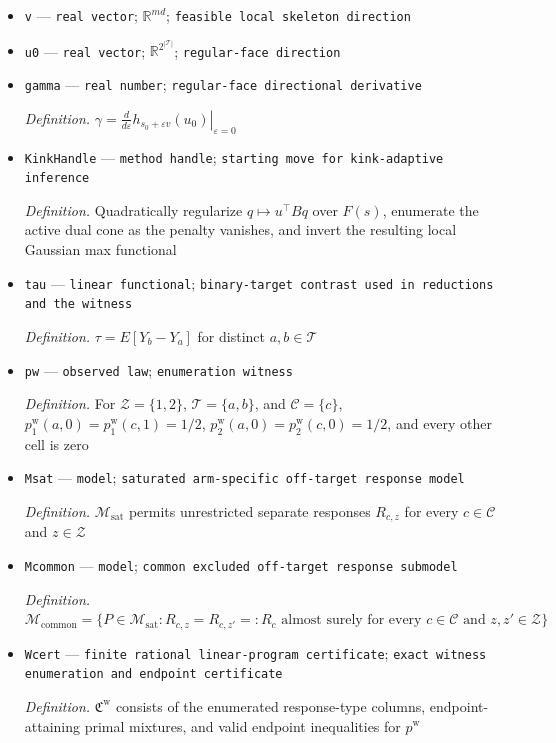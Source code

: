 \documentclass{article}
\begin{document}
\begin{itemize}
  \item \texttt{v} --- \texttt{real vector}; \(\mathbb R^{md}\); \texttt{feasible local skeleton direction}
  \item \texttt{u0} --- \texttt{real vector}; \(\mathbb R^{2^{|\mathcal T|}}\); \texttt{regular-\allowbreak{}face direction}
  \item \texttt{gamma} --- \texttt{real number}; \texttt{regular-\allowbreak{}face directional derivative}
  \par\smallskip\noindent\emph{Definition.} \(\gamma=\left.\frac{d}{d\varepsilon}h_{s_0+\varepsilon v}(u_0)\right|_{\varepsilon=0}\)
  \item \texttt{KinkHandle} --- \texttt{method handle}; \texttt{starting move for kink-\allowbreak{}adaptive inference}
  \par\smallskip\noindent\emph{Definition.} Quadratically regularize \(q\mapsto u^\top Bq\) over \(F(s)\), enumerate the active dual cone as the penalty vanishes, and invert the resulting local Gaussian max functional
  \item \texttt{tau} --- \texttt{linear functional}; \texttt{binary-\allowbreak{}target contrast used in reductions and the witness}
  \par\smallskip\noindent\emph{Definition.} \(\tau=E[Y_b-Y_a]\) for distinct \(a,b\in\mathcal T\)
  \item \texttt{pw} --- \texttt{observed law}; \texttt{enumeration witness}
  \par\smallskip\noindent\emph{Definition.} For \(\mathcal Z=\{1,2\}\), \(\mathcal T=\{a,b\}\), and \(\mathcal C=\{c\}\), \(p^{\mathrm w}_1(a,0)=p^{\mathrm w}_1(c,1)=1/2\), \(p^{\mathrm w}_2(a,0)=p^{\mathrm w}_2(c,0)=1/2\), and every other cell is zero
  \item \texttt{Msat} --- \texttt{model}; \texttt{saturated arm-\allowbreak{}specific off-\allowbreak{}target response model}
  \par\smallskip\noindent\emph{Definition.} \(\mathcal M_{\mathrm{sat}}\) permits unrestricted separate responses \(R_{c,z}\) for every \(c\in\mathcal C\) and \(z\in\mathcal Z\)
  \item \texttt{Mcommon} --- \texttt{model}; \texttt{common excluded off-\allowbreak{}target response submodel}
  \par\smallskip\noindent\emph{Definition.} \(\mathcal M_{\mathrm{common}}=\{P\in\mathcal M_{\mathrm{sat}}:R_{c,z}=R_{c,z'}=:R_c\text{ almost surely for every }c\in\mathcal C\text{ and }z,z'\in\mathcal Z\}\)
  \item \texttt{Wcert} --- \texttt{finite rational linear-\allowbreak{}program certificate}; \texttt{exact witness enumeration and endpoint certificate}
  \par\smallskip\noindent\emph{Definition.} \(\mathfrak C^{\mathrm w}\) consists of the enumerated response-type columns, endpoint-attaining primal mixtures, and valid endpoint inequalities for \(p^{\mathrm w}\)
\end{itemize}
\end{document}
